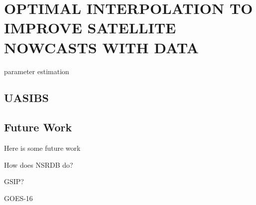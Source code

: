 \chapter{OPTIMAL INTERPOLATION TO IMPROVE SATELLITE NOWCASTS WITH DATA}
\label{chap:satoi}

parameter estimation

\section{UASIBS}

\section{Future Work}

Here is some future work

How does NSRDB do?

GSIP?

GOES-16
